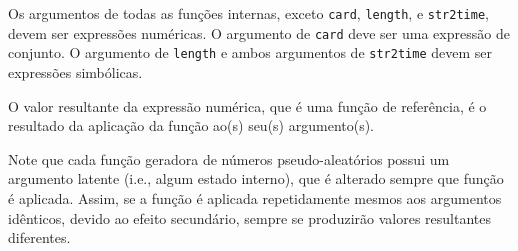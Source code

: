 \documentclass[11pt, brazil]{report}
\begin{document}

Os argumentos de todas as funções internas, exceto {\tt card}, {\tt length},
e {\tt str2time}, devem ser \linebreak expressões numéricas. O argumento de
{\tt card} deve ser uma expressão de conjunto. O argumento de {\tt length} e
ambos argumentos de {\tt str2time} devem ser expressões simbólicas.

O valor resultante da expressão numérica, que é uma função de referência,
é o resultado da aplicação da função ao(s) seu(s) argumento(s).

Note que cada função geradora de números pseudo-aleatórios possui um argumento
latente (i.e., algum estado interno), que é alterado sempre que função é aplicada.
Assim, se a função é aplicada repetidamente mesmos aos argumentos idênticos,
devido ao efeito secundário, sempre se produzirão valores resultantes diferentes.

%
%
\newpage
\end{document}
